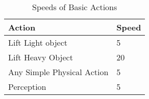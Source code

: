 \begin{table}[h]
\centering
\caption{Speeds of Basic Actions}
	\begin{tabular}{ll} \hline
    Action						& Speed \\ \hline
	Lift Light object			&	5 \\
	Lift Heavy Object           &  20 \\
	Any Simple Physical Action  &   5 \\
	Perception					&	5 \\ \hline
	\end{tabular}
\end{table}
